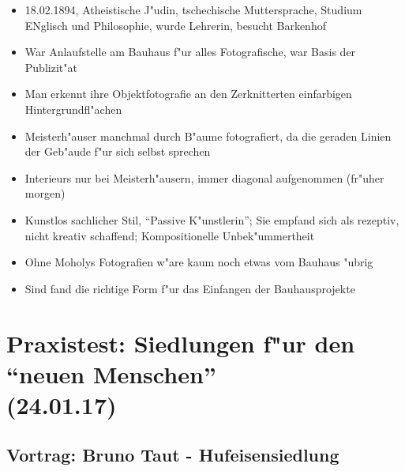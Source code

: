 \documentclass[a5paper]{scrartcl}
\begin{document}
\begin{itemize}
  \item 18.02.1894, Atheistische J"udin, tschechische Muttersprache, Studium ENglisch und Philosophie, wurde Lehrerin, besucht Barkenhof
  \item War Anlaufstelle am Bauhaus f"ur alles Fotografische, war Basis der Publizit"at
  \item Man erkennt ihre Objektfotografie an den Zerknitterten einfarbigen Hintergrundfl"achen
  \item Meisterh"auser manchmal durch B"aume fotografiert, da die geraden Linien der Geb"aude f"ur sich selbst sprechen
  \item Interieurs nur bei Meisterh"ausern, immer diagonal aufgenommen (fr"uher morgen)
  \item Kunstlos sachlicher Stil, "`Passive K"unstlerin"'; Sie empfand sich als rezeptiv, nicht kreativ schaffend; Kompositionelle Unbek"ummertheit
  \item Ohne Moholys Fotografien w"are kaum noch etwas vom Bauhaus "ubrig
  \item Sind fand die richtige Form f"ur das Einfangen der Bauhausprojekte
\end{itemize}


\section{Praxistest: Siedlungen f"ur den "`neuen Menschen"'\\(24.01.17)}

\subsection{Vortrag: Bruno Taut - Hufeisensiedlung}
\end{document}
